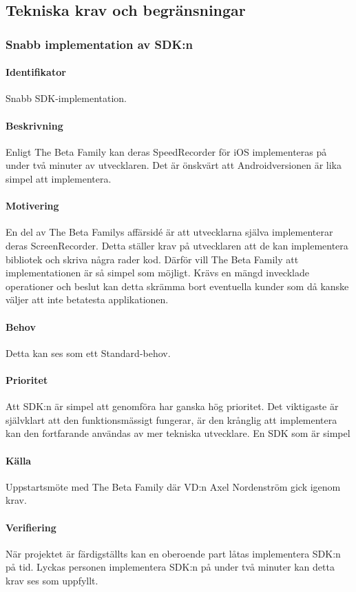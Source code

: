 \subsection{Tekniska krav och begränsningar}
\subsubsection{Snabb implementation av SDK:n}
\paragraph{Identifikator} 
Snabb SDK-implementation.
\paragraph{Beskrivning}
Enligt The Beta Family kan deras SpeedRecorder för iOS implementeras på under två minuter av utvecklaren. Det är önskvärt att Androidversionen är lika simpel att implementera.
\paragraph{Motivering}
En del av The Beta Familys affärsidé är att utvecklarna själva implementerar deras ScreenRecorder. Detta ställer krav på utvecklaren att de kan implementera bibliotek och skriva några rader kod. Därför vill The Beta Family att implementationen är så simpel som möjligt. Krävs en mängd invecklade operationer och beslut kan detta skrämma bort eventuella kunder som då kanske väljer att inte betatesta applikationen.
\paragraph{Behov}
Detta kan ses som ett Standard-behov.
\paragraph{Prioritet}
Att SDK:n är simpel att genomföra har ganska hög prioritet. Det viktigaste är självklart att den funktionsmässigt fungerar, är den krånglig att implementera kan den fortfarande användas av mer tekniska utvecklare. En SDK som är simpel 
\paragraph{Källa}
Uppstartsmöte med The Beta Family där VD:n Axel Nordenström gick igenom krav.
\paragraph{Verifiering}
När projektet är färdigställts kan en oberoende part låtas implementera SDK:n på tid. Lyckas personen implementera SDK:n på under två minuter kan detta krav ses som uppfyllt.
